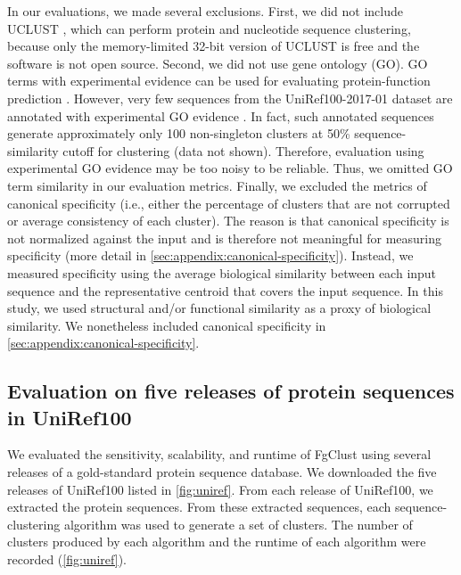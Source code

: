\documentclass{bioinfo}
\begin{document}
In our evaluations, we made several exclusions.
First, we did not include UCLUST \citep{edgar2010search}, which can perform protein and nucleotide sequence clustering, because only the memory-limited 32-bit version of UCLUST is free and the software is not open source.
Second, we did not use gene ontology (GO).
GO terms with experimental evidence can be used for evaluating protein-function prediction \citep{radivojac2013large}.
However, very few sequences from the UniRef100-2017-01 dataset are annotated with experimental GO evidence \citep{suzek2014uniref}.
In fact, such annotated sequences generate approximately only 100 non-singleton clusters at 50\% sequence-similarity cutoff for clustering (data not shown).
Therefore, evaluation using experimental GO evidence may be too noisy to be reliable.
Thus, we omitted GO term similarity in our evaluation metrics.
Finally, we excluded the metrics of canonical specificity (i.e., either the percentage of clusters that are not corrupted or average consistency of each cluster).
The reason is that canonical specificity is not normalized against the input and is therefore not meaningful for measuring specificity (more detail in \cref{sec:appendix:canonical-specificity}).
Instead, we measured specificity using the average biological similarity between each input sequence and the representative centroid that covers the input sequence.
In this study, we used structural and/or functional similarity as a proxy of biological similarity.
We nonetheless included canonical specificity in \cref{sec:appendix:canonical-specificity}.

\subsection{Evaluation on five releases of protein sequences in UniRef100}

We evaluated the sensitivity, scalability, and runtime of FgClust using several releases of a gold-standard protein sequence database.
We downloaded the five releases of UniRef100 \citep{suzek2007uniref} listed in \cref{fig:uniref}.
From each release of UniRef100, we extracted the protein sequences.
From these extracted sequences, each sequence-clustering algorithm was used to generate a set of clusters.
The number of clusters produced by each algorithm and the runtime of each algorithm were recorded (\cref{fig:uniref}).
\end{document}
